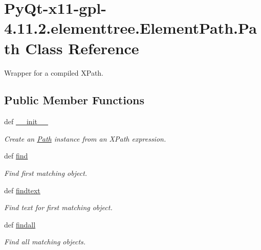 \hypertarget{classPyQt-x11-gpl-4_811_82_1_1elementtree_1_1ElementPath_1_1Path}{}\section{Py\+Qt-\/x11-\/gpl-\/4.11.2.elementtree.\+Element\+Path.\+Path Class Reference}
\label{classPyQt-x11-gpl-4_811_82_1_1elementtree_1_1ElementPath_1_1Path}


Wrapper for a compiled X\+Path.  


\subsection*{Public Member Functions}
\begin{DoxyCompactItemize}
\item 
def \hyperlink{classPyQt-x11-gpl-4_811_82_1_1elementtree_1_1ElementPath_1_1Path_a0b85326956c50a3bc0ac4005e714cfc8}{\+\_\+\+\_\+init\+\_\+\+\_\+}
\begin{DoxyCompactList}\small\item\em Create an \hyperlink{classPyQt-x11-gpl-4_811_82_1_1elementtree_1_1ElementPath_1_1Path}{Path} instance from an X\+Path expression. \end{DoxyCompactList}\item 
def \hyperlink{classPyQt-x11-gpl-4_811_82_1_1elementtree_1_1ElementPath_1_1Path_a6f4317001515a64f07dadafaa151d580}{find}
\begin{DoxyCompactList}\small\item\em Find first matching object. \end{DoxyCompactList}\item 
def \hyperlink{classPyQt-x11-gpl-4_811_82_1_1elementtree_1_1ElementPath_1_1Path_af6358bf1afc82e5403f5a423df4e7117}{findtext}
\begin{DoxyCompactList}\small\item\em Find text for first matching object. \end{DoxyCompactList}\item 
def \hyperlink{classPyQt-x11-gpl-4_811_82_1_1elementtree_1_1ElementPath_1_1Path_abcb3f46428c2a9997e6571c3ca09379a}{findall}
\begin{DoxyCompactList}\small\item\em Find all matching objects. \end{DoxyCompactList}\end{DoxyCompactItemize}
